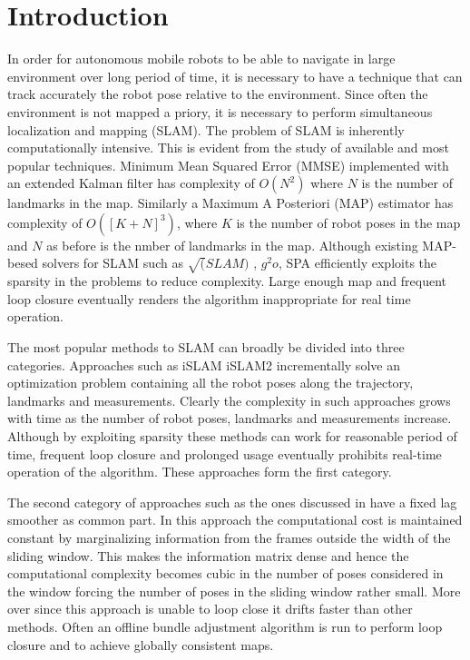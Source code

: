 \chapter{Introduction}
\label{sec:introduction}

In order for autonomous mobile robots to be able to navigate in large environment over long period of time, it is necessary to have a technique that can track accurately the robot pose relative to the environment. Since often the environment is not mapped a priory, it is necessary to perform simultaneous localization and mapping (SLAM). The problem of SLAM is inherently computationally intensive. This is evident from the study of available and most popular techniques. Minimum Mean Squared Error (MMSE)\cite{EkFSLAM} implemented with an extended Kalman filter has complexity of $O(N^2)$ where $N$ is the number of landmarks in the map. Similarly a Maximum A Posteriori (MAP) estimator\cite{FULL-BA-BASED} has complexity of $O([K+N]^3)$, where $K$ is the number of robot poses in the map and $N$ as before is the nmber of landmarks in the map. Although existing MAP-besed solvers for SLAM such as $\sqrt(SLAM)$ \cite{FULL-BA-BASED}, $g^2o$\cite{}, SPA \cite{} efficiently exploits the sparsity in the problems to reduce complexity. Large enough map and frequent loop closure eventually renders the algorithm inappropriate for real time operation.

The most popular methods to SLAM can broadly be divided into three categories. Approaches such as iSLAM\cite{} iSLAM2\cite{} incrementally solve an optimization problem containing all the robot poses along the trajectory, landmarks and measurements. Clearly the complexity in such approaches grows with time as the number of robot poses, landmarks and measurements increase. Although by exploiting sparsity these methods can work for reasonable period of time, frequent loop closure and prolonged usage eventually prohibits real-time operation of the algorithm. These approaches form the first category.

The second category of approaches such as the ones discussed in \cite {} have a fixed lag smoother as common part. In this approach the computational cost is maintained constant by marginalizing information from the frames outside the width of the sliding window. This makes the information matrix dense and hence the computational complexity becomes cubic in the number of poses considered in the window forcing the number of poses in the sliding window rather small. More over since this approach is unable to loop close it drifts faster than other methods. Often an offline bundle adjustment algorithm is run to perform loop closure and to achieve globally consistent maps.

